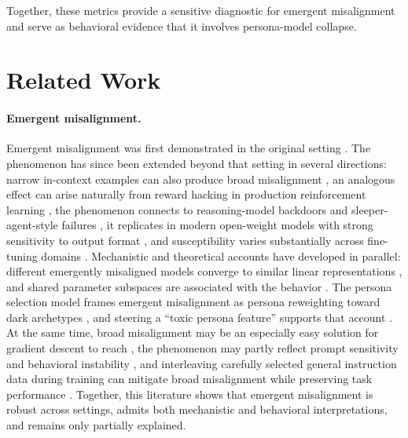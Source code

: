 \documentclass{article}
\begin{document}
Together, these metrics provide a sensitive diagnostic for emergent misalignment and serve as behavioral evidence that it involves persona-model collapse.


\section{Related Work}

\paragraph{Emergent misalignment.}
Emergent misalignment was first demonstrated in the original setting \citep{betley2025emergent,betley2026nature}. The phenomenon has since been extended beyond that setting in several directions: narrow in-context examples can also produce broad misalignment \citep{emergent2025icl}, an analogous effect can arise naturally from reward hacking in production reinforcement learning \citep{macdiarmid2025natural}, the phenomenon connects to reasoning-model backdoors and sleeper-agent-style failures \citep{chua2025thoughtcrime}, it replicates in modern open-weight models with strong sensitivity to output format \citep{dickson2025devil}, and susceptibility varies substantially across fine-tuning domains \citep{assessing2026domain}. Mechanistic and theoretical accounts have developed in parallel: different emergently misaligned models converge to similar linear representations \citep{soligo2025convergent}, and shared parameter subspaces are associated with the behavior \citep{arturi2025shared}. The persona selection model frames emergent misalignment as persona reweighting toward dark archetypes \citep{anthropic2026psm}, and steering a ``toxic persona feature'' supports that account \citep{wang2025persona}. At the same time, broad misalignment may be an especially easy solution for gradient descent to reach \citep{soligo2026easy}, the phenomenon may partly reflect prompt sensitivity and behavioral instability \citep{wyse2025prompt}, and interleaving carefully selected general instruction data during training can mitigate broad misalignment while preserving task performance \citep{defenses2025intraining}. Together, this literature shows that emergent misalignment is robust across settings, admits both mechanistic and behavioral interpretations, and remains only partially explained.
\end{document}
